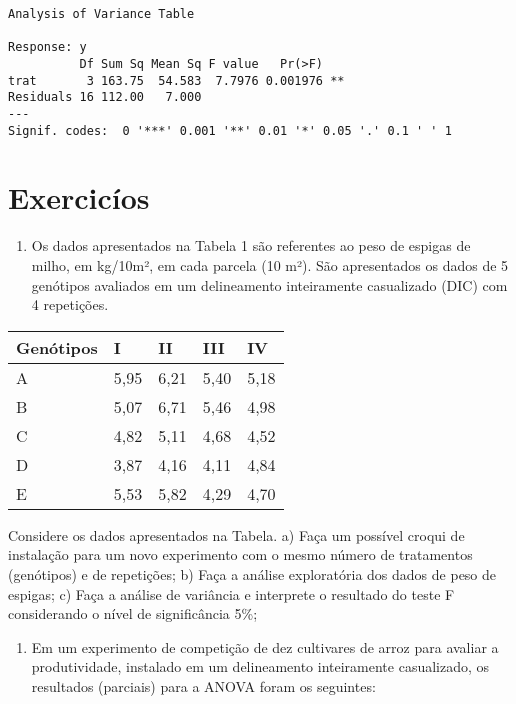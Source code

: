 \documentclass[
]{book}
\providecommand{\tightlist}{%
  \setlength{\itemsep}{0pt}\setlength{\parskip}{0pt}}
\begin{document}
\begin{verbatim}
Analysis of Variance Table

Response: y
          Df Sum Sq Mean Sq F value   Pr(>F)   
trat       3 163.75  54.583  7.7976 0.001976 **
Residuals 16 112.00   7.000                    
---
Signif. codes:  0 '***' 0.001 '**' 0.01 '*' 0.05 '.' 0.1 ' ' 1
\end{verbatim}

\hypertarget{exercicuxedos-2}{%
\section{Exercicíos}\label{exercicuxedos-2}}

\begin{enumerate}
\def\labelenumi{\arabic{enumi})}
\tightlist
\item
  Os dados apresentados na Tabela 1 são referentes ao peso de espigas de milho, em kg/10m², em cada parcela (10 m²). São apresentados os dados de 5 genótipos avaliados em um delineamento inteiramente casualizado (DIC) com 4 repetições.
\end{enumerate}

\begin{longtable}[]{@{}lllll@{}}
\toprule()
Genótipos & I & II & III & IV \\
\midrule()
\endhead
A & 5,95 & 6,21 & 5,40 & 5,18 \\
B & 5,07 & 6,71 & 5,46 & 4,98 \\
C & 4,82 & 5,11 & 4,68 & 4,52 \\
D & 3,87 & 4,16 & 4,11 & 4,84 \\
E & 5,53 & 5,82 & 4,29 & 4,70 \\
\bottomrule()
\end{longtable}

Considere os dados apresentados na Tabela.
a) Faça um possível croqui de instalação para um novo experimento com o mesmo número de tratamentos (genótipos) e de repetições;
b) Faça a análise exploratória dos dados de peso de espigas;
c) Faça a análise de variância e interprete o resultado do teste F considerando o nível de significância 5\%;

\begin{enumerate}
\def\labelenumi{\arabic{enumi})}
\setcounter{enumi}{1}
\tightlist
\item
  Em um experimento de competição de dez cultivares de arroz para avaliar a produtividade, instalado em um delineamento inteiramente casualizado, os resultados (parciais) para a ANOVA foram os seguintes:
\end{enumerate}
\end{document}
